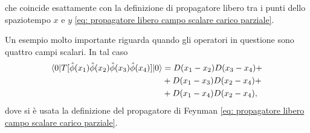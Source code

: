 che coincide esattamente con la definizione di propagatore libero tra i punti dello spaziotempo $x$ e $y$ \eqref{eq: propagatore libero campo scalare carico parziale}.
\begin{ex}
    Un esempio molto importante riguarda quando gli operatori in questione sono quattro campi scalari. In tal caso
    \begin{equation}
        \begin{split}
            \langle 0 | T[\hat{\phi}(x_1)\hat{\phi}(x_2)\hat{\phi}(x_3)\hat{\phi}(x_4)] | 0 \rangle &= D(x_1 - x_2)D(x_3 - x_4) + \\
            &+ D(x_1 -x_3)D(x_2 - x_4) + \\
            &+ D(x_1 - x_4)D(x_2 - x_4),
        \end{split}
    \end{equation}
    dove si è usata la definizione del propagatore di Feynman \eqref{eq: propagatore libero campo scalare carico parziale}.
\end{ex}